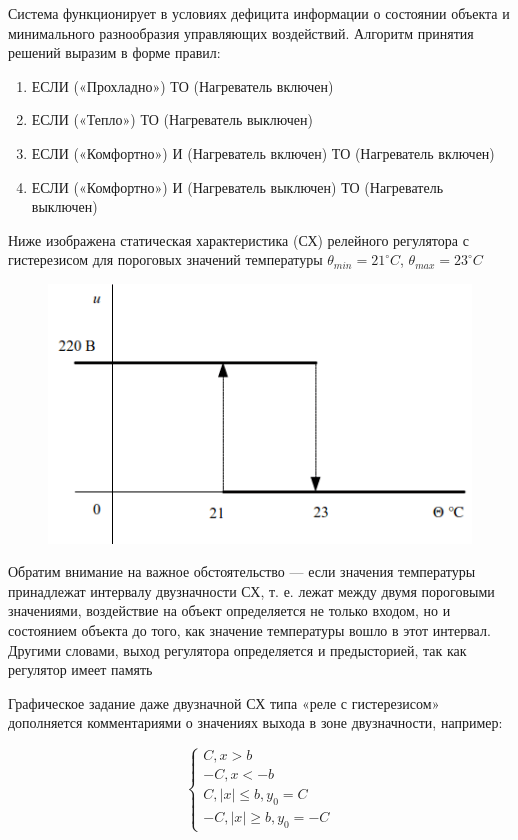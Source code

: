 Система функционирует в условиях дефицита информации о состоянии объекта и минимального разнообразия управляющих воздействий. Алгоритм принятия решений выразим в форме правил:

\begin{enumerate}
	\item ЕСЛИ («Прохладно») ТО (Нагреватель включен)
	\item ЕСЛИ («Тепло») ТО (Нагреватель выключен)
	\item ЕСЛИ («Комфортно») И (Нагреватель включен) ТО (Нагреватель включен)
	\item ЕСЛИ («Комфортно») И (Нагреватель выключен) ТО (Нагреватель выключен)
\end{enumerate}

Ниже изображена статическая характеристика (СХ) релейного регулятора с гистерезисом для пороговых значений температуры $\theta_{min} = 21 ^{\circ}C$, $\theta_{max} = 23 ^{\circ}C$

\begin{figure}[H]
	\centering
	\includegraphics[width=0.7\linewidth]{body/images/relay.png}
\end{figure}

Обратим внимание на важное обстоятельство — если значения температуры принадлежат интервалу двузначности СХ, т. е. лежат между двумя пороговыми значениями, воздействие на объект определяется не только входом, но и состоянием объекта до того, как значение температуры вошло в этот интервал. Другими словами, выход регулятора определяется и предысторией, так как регулятор имеет память

Графическое задание даже двузначной СХ типа «реле с гистерезисом» дополняется комментариями о значениях выхода в зоне двузначности, например: 

$$
\begin{cases}
	C, x > b \\ 
	- C, x < -b \\
	C, |x|\leq b, y_0 = C \\
	-C, |x|\geq b, y_0 = -C
\end{cases}
$$

